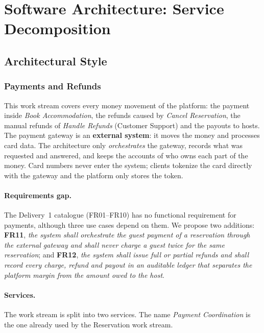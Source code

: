 \section{Software Architecture: Service Decomposition}



\subsection{Architectural Style}


\begingroup
\setlength{\emergencystretch}{3em}
\subsubsection{Payments and Refunds}
\label{sec:pay-style}

This work stream covers every money movement of the platform: the payment
inside \emph{Book Accommodation}, the refunds caused by \emph{Cancel
Reservation}, the manual refunds of \emph{Handle Refunds} (Customer Support)
and the payouts to hosts. The payment gateway is an \textbf{external system}:
it moves the money and processes card data. The architecture only
\emph{orchestrates} the gateway, records what was requested and answered, and
keeps the accounts of who owns each part of the money. Card numbers never
enter the system; clients tokenize the card directly with the gateway and the
platform only stores the token.

\paragraph{Requirements gap.} The Delivery~1 catalogue (FR01--FR10) has no
functional requirement for payments, although three use cases depend on them.
We propose two additions: \textbf{FR11}, \emph{the system shall orchestrate
the guest payment of a reservation through the external gateway and shall
never charge a guest twice for the same reservation}; and \textbf{FR12},
\emph{the system shall issue full or partial refunds and shall record every
charge, refund and payout in an auditable ledger that separates the platform
margin from the amount owed to the host}.

\paragraph{Services.} The work stream is split into two services. The name
\emph{Payment Coordination} is the one already used by the Reservation work
stream.


